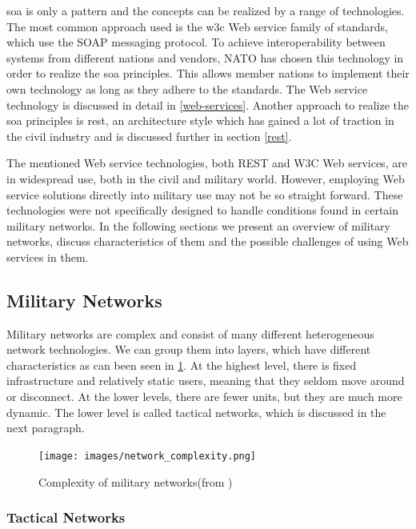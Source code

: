 \gls{soa} is only a pattern and the concepts can be realized by a range of
technologies. The most common approach used is the \gls{w3c} Web service family
of standards, which use the SOAP messaging protocol. To achieve interoperability
between systems from different nations and vendors, NATO has chosen this
technology in order to realize the \gls{soa} principles\cite{soa-baseline}. This
allows member nations to implement their own technology as long as they adhere
to the standards. The Web service technology is discussed in detail in
\cref{web-services}. Another approach to realize the \gls{soa} principles is
\gls{rest}, an architecture style which has gained a lot of traction in the
civil industry and is discussed further in section \cref{rest}.

The mentioned Web service technologies, both REST and W3C Web services, are in
widespread use, both in the civil and military world. However, employing Web
service solutions directly into military use may not be so straight forward.
These technologies were not specifically designed to handle conditions found in
certain military networks. In the following sections we present an overview of
military networks, discuss characteristics of them and the possible challenges
of using Web services in them.

\subsection{Military Networks}

Military networks are complex and consist of many different heterogeneous
network technologies. We can group them into layers, which have different
characteristics as can been seen in \cref{figure:military-networks}. At the
highest level, there is fixed infrastructure and relatively static users,
meaning that they seldom move around or disconnect. At the lower levels, there
are fewer units, but they are much more dynamic. The lower level is called
tactical networks, which is discussed in the next paragraph.

\begin{figure}[h]
\texttt{[image: images/network\_complexity.png]}
\caption{Complexity of military networks(from \cite{pervasive-web})}
\label{figure:military-networks}
\end{figure}

\subsubsection{Tactical Networks}

